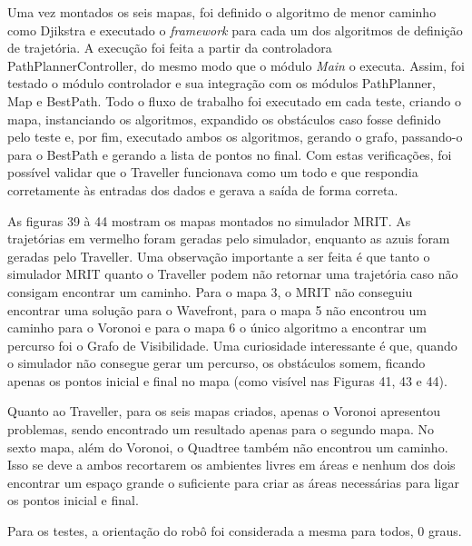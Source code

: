 Uma vez montados os seis mapas, foi definido o algoritmo de menor caminho como Djikstra e executado o \textit{framework} para cada um dos algoritmos de definição de trajetória. A execução foi feita a partir da controladora PathPlannerController, do mesmo modo que o módulo \textit{Main} o executa. Assim, foi testado o módulo controlador e sua integração com os módulos PathPlanner, Map e BestPath. Todo o fluxo de trabalho foi executado em cada teste, criando o mapa, instanciando os algoritmos, expandido os obstáculos caso fosse definido pelo teste e, por fim, executado ambos os algoritmos, gerando o grafo, passando-o para o BestPath e gerando a lista de pontos no final. Com estas verificações, foi possível validar que o Traveller funcionava como um todo e que respondia corretamente às entradas dos dados e gerava a saída de forma correta.

As figuras 39 à 44 mostram os mapas montados no simulador MRIT. As trajetórias em vermelho foram geradas pelo simulador, enquanto as azuis foram geradas pelo Traveller. Uma observação importante a ser feita é que tanto o simulador MRIT quanto o Traveller podem não retornar uma trajetória caso não consigam encontrar um caminho. Para o mapa 3, o MRIT não conseguiu encontrar uma solução para o Wavefront, para o mapa 5 não encontrou um caminho para o Voronoi e para o mapa 6 o único algoritmo a encontrar um percurso foi o Grafo de Visibilidade. Uma curiosidade interessante é que, quando o simulador não consegue gerar um percurso, os obstáculos somem, ficando apenas os pontos inicial e final no mapa (como visível nas Figuras 41, 43 e 44).

Quanto ao Traveller, para os seis mapas criados, apenas o Voronoi apresentou problemas, sendo encontrado um resultado apenas para o segundo mapa. No sexto mapa, além do Voronoi, o Quadtree também não encontrou um caminho. Isso se deve a ambos recortarem os ambientes livres em áreas e nenhum dos dois encontrar um espaço grande o suficiente para criar as áreas necessárias para ligar os pontos inicial e final.

Para os testes, a orientação do robô foi considerada a mesma para todos, 0 graus.

